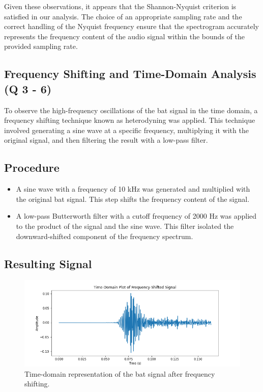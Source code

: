 \documentclass[12pt]{article}
\begin{document}
Given these observations, it appears that the Shannon-Nyquist criterion is satisfied in our analysis. The choice of an appropriate sampling rate and the correct handling of the Nyquist frequency ensure that the spectrogram accurately represents the frequency content of the audio signal within the bounds of the provided sampling rate.

\subsection{Frequency Shifting and Time-Domain Analysis (Q 3 - 6)}
To observe the high-frequency oscillations of the bat signal in the time domain, a frequency shifting technique known as heterodyning was applied. This technique involved generating a sine wave at a specific frequency, multiplying it with the original signal, and then filtering the result with a low-pass filter.

\subsection*{Procedure}
\begin{itemize}
    \item A sine wave with a frequency of 10 kHz was generated and multiplied with the original bat signal. This step shifts the frequency content of the signal.
    
    \item A low-pass Butterworth filter with a cutoff frequency of 2000 Hz was applied to the product of the signal and the sine wave. This filter isolated the downward-shifted component of the frequency spectrum.
\end{itemize}

\subsection*{Resulting Signal}
\begin{figure}[h]
\centering
\includegraphics[width=1\textwidth]{shifted_time_domain.png}
\caption{Time-domain representation of the bat signal after frequency shifting.}
\end{figure}
\end{document}
